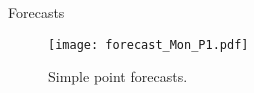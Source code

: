 \documentclass[notes]{beamer}
\begin{document}
\begin{frame}{Forecasts}
\begin{figure}
\centering
\texttt{[image: forecast\_Mon\_P1.pdf]}
\caption{Simple point forecasts.}
\label{fig:forecasts} 
\end{figure}\end{frame}

\end{document}
